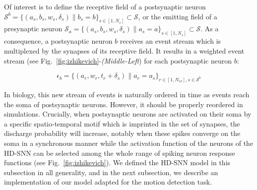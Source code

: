 \documentclass[default]{sn-jnl}%
\theoremstyle{thmstyleone}%
\theoremstyle{thmstyletwo}%
\theoremstyle{thmstylethree}%
\newcommand{\seeFig}[1]{see Fig.~\ref{fig:#1}}%
\newcommand{\presynaddr}{a} %
\newcommand{\postsynaddr}{b} %
\newcommand{\numevent}{N_{ev}} %
\newcommand{\arank}{r} %
\newcommand{\synapse}{\mathcal{S}} %
\newcommand{\synapticweight}{w} %
\newcommand{\synapticdelay}{\delta} %
\newcommand{\ranksyn}{s} %
\newcommand{\Nsyn}{N_{s}} %
\newcommand{\timev}{t} %
\newcommand{\event}{\epsilon} %
\begin{document}
Of interest is to define the receptive field of a postsynaptic neuron $\synapse^\postsynaddr =  \{(\presynaddr_\ranksyn, \postsynaddr_\ranksyn, \synapticweight_\ranksyn, \synapticdelay_\ranksyn) \| \postsynaddr_\ranksyn=\postsynaddr\}_{\ranksyn \in [1,\Nsyn]}  \subset \synapse$, or the emitting field of a presynaptic neuron $\synapse_\presynaddr = \{(\presynaddr_\ranksyn, \postsynaddr_\ranksyn, \synapticweight_\ranksyn, \synapticdelay_\ranksyn) \| \presynaddr_\ranksyn=\presynaddr\}_{\ranksyn \in [1,\Nsyn]} \subset \synapse$. As a consequence, a postsynaptic neuron $\postsynaddr$ receives an event stream which is multiplexed by the synapses of its receptive field. It results in a weighted event stream (\seeFig{izhikevich}-\textit{(Middle-Left}) for each  postsynaptic neuron $\postsynaddr$: 
%
\begin{linenomath*}
\begin{equation}\label{eq:stream_b}
\event_\postsynaddr = \{(\presynaddr_\arank, \synapticweight_\arank, \timev_\arank+\synapticdelay_\ranksyn) \| \presynaddr_\arank = \presynaddr_\ranksyn \}_{\arank \in [1,\numevent], \ranksyn \in \synapse^\postsynaddr}
\end{equation}
\end{linenomath*}
%
In biology, this new stream of events is naturally ordered in time as events reach the soma of postsynaptic neurons. However, it should be properly reordered in simulations. Crucially, when postsynaptic neurons are activated on their soma by a specific spatio-temporal motif which is imprinted in the set of synapses, the discharge probability will increase, notably when these spikes converge on the soma in a synchronous manner while the activation function of the neurons of the HD-SNN can be selected among the whole range of spiking neuron response functions (\seeFig{izhikevich}). We defined the HD-SNN model in this subsection in all generality, and in the next subsection, we describe an implementation of our model adapted for the motion detection task. 
%
\end{document}
